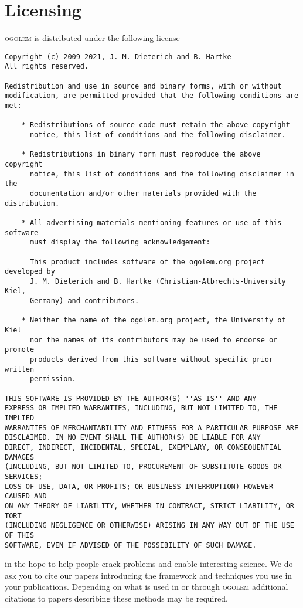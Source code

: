 \documentclass[a4paper,10pt]{scrbook}
\newcommand{\ogo}{\textsc{ogolem}}
\begin{document}
\section{Licensing}
\ogo{} is distributed under the following license
\begin{verbatim}
Copyright (c) 2009-2021, J. M. Dieterich and B. Hartke
All rights reserved.

Redistribution and use in source and binary forms, with or without
modification, are permitted provided that the following conditions are met:

    * Redistributions of source code must retain the above copyright
      notice, this list of conditions and the following disclaimer.

    * Redistributions in binary form must reproduce the above copyright
      notice, this list of conditions and the following disclaimer in the
      documentation and/or other materials provided with the distribution.

    * All advertising materials mentioning features or use of this software
      must display the following acknowledgement:

      This product includes software of the ogolem.org project developed by
      J. M. Dieterich and B. Hartke (Christian-Albrechts-University Kiel,
      Germany) and contributors.

    * Neither the name of the ogolem.org project, the University of Kiel
      nor the names of its contributors may be used to endorse or promote
      products derived from this software without specific prior written
      permission.

THIS SOFTWARE IS PROVIDED BY THE AUTHOR(S) ''AS IS'' AND ANY
EXPRESS OR IMPLIED WARRANTIES, INCLUDING, BUT NOT LIMITED TO, THE IMPLIED
WARRANTIES OF MERCHANTABILITY AND FITNESS FOR A PARTICULAR PURPOSE ARE
DISCLAIMED. IN NO EVENT SHALL THE AUTHOR(S) BE LIABLE FOR ANY
DIRECT, INDIRECT, INCIDENTAL, SPECIAL, EXEMPLARY, OR CONSEQUENTIAL DAMAGES
(INCLUDING, BUT NOT LIMITED TO, PROCUREMENT OF SUBSTITUTE GOODS OR SERVICES;
LOSS OF USE, DATA, OR PROFITS; OR BUSINESS INTERRUPTION) HOWEVER CAUSED AND
ON ANY THEORY OF LIABILITY, WHETHER IN CONTRACT, STRICT LIABILITY, OR TORT
(INCLUDING NEGLIGENCE OR OTHERWISE) ARISING IN ANY WAY OUT OF THE USE OF THIS
SOFTWARE, EVEN IF ADVISED OF THE POSSIBILITY OF SUCH DAMAGE.
\end{verbatim}
in the hope to help people crack problems and enable interesting science. We do 
ask you to cite our papers
introducing the framework and techniques you use in your
publications\cite{ogolem_first,lj_reparam,ogo_switches, 
kana_dimer,benchmark,water_pccp,gdm,water_small,cage1,cage2,earth}. Depending 
on what is used in or through \ogo{} additional citations to papers describing 
these methods may be required.
\end{document}
